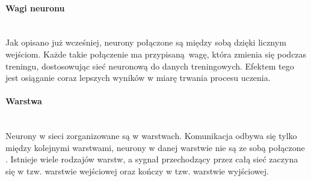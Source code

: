 \paragraph{Wagi neuronu} \mbox{}\\
Jak opisano już wcześniej, neurony połączone są między sobą dzięki licznym wejściom.
Każde takie połączenie ma przypisaną wagę, która zmienia się podczas treningu,
dostosowując sieć neuronową do danych treningowych. Efektem tego jest osiąganie
coraz lepszych wyników w miarę trwania procesu uczenia.

\paragraph{Warstwa} \mbox{}\\
Neurony w sieci zorganizowane są w warstwach. Komunikacja odbywa się tylko między kolejnymi
warstwami, neurony w danej warstwie nie są ze sobą połączone \cite{CS231n, substBigConv}.
Istnieje wiele rodzajów warstw, a sygnał przechodzący przez całą sieć zaczyna się w tzw.
warstwie wejściowej oraz kończy w tzw. warstwie wyjściowej.


